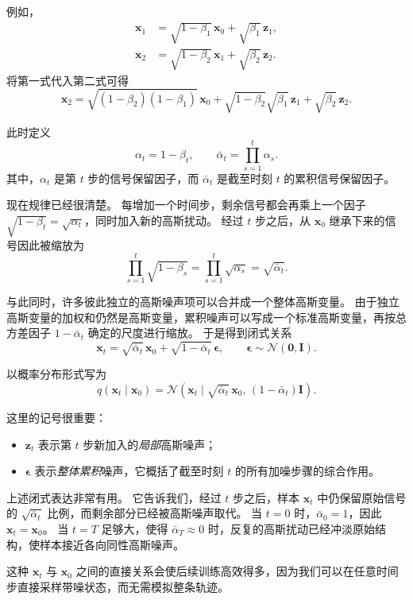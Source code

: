 例如，
\[
\begin{aligned}
\mathbf{x}_1
&=
\sqrt{1-\beta_1}\,\mathbf{x}_0
+
\sqrt{\beta_1}\,\mathbf{z}_1,\\[4pt]
\mathbf{x}_2
&=
\sqrt{1-\beta_2}\,\mathbf{x}_1
+
\sqrt{\beta_2}\,\mathbf{z}_2.
\end{aligned}
\]
将第一式代入第二式可得
\[
\mathbf{x}_2
=
\sqrt{(1-\beta_2)(1-\beta_1)}\,\mathbf{x}_0
+
\sqrt{1-\beta_2}\sqrt{\beta_1}\,\mathbf{z}_1
+
\sqrt{\beta_2}\,\mathbf{z}_2.
\]

此时定义
\[
\alpha_t = 1-\beta_t,
\qquad
\bar{\alpha}_t = \prod_{s=1}^{t}\alpha_s.
\]
其中，$\alpha_t$ 是第 $t$ 步的信号保留因子，而 $\bar{\alpha}_t$ 是截至时刻 $t$ 的累积信号保留因子。

现在规律已经很清楚。
每增加一个时间步，剩余信号都会再乘上一个因子
$\sqrt{1-\beta_t}=\sqrt{\alpha_t}$，同时加入新的高斯扰动。
经过 $t$ 步之后，从 $\mathbf{x}_0$ 继承下来的信号因此被缩放为
\[
\prod_{s=1}^{t}\sqrt{1-\beta_s}
=
\prod_{s=1}^{t}\sqrt{\alpha_s}
=
\sqrt{\bar{\alpha}_t}.
\]

与此同时，许多彼此独立的高斯噪声项可以合并成一个整体高斯变量。
由于独立高斯变量的加权和仍然是高斯变量，累积噪声可以写成一个标准高斯变量，再按总方差因子 $1-\bar{\alpha}_t$ 确定的尺度进行缩放。
于是得到闭式关系
\[
\mathbf{x}_t
=
\sqrt{\bar{\alpha}_t}\,\mathbf{x}_0
+
\sqrt{1-\bar{\alpha}_t}\,\boldsymbol{\epsilon},
\qquad
\boldsymbol{\epsilon}\sim\mathcal{N}(\mathbf{0},\mathbf{I}).
\]

以概率分布形式写为
\[
q(\mathbf{x}_t\mid \mathbf{x}_0)
=
\mathcal{N}\!\left(
\mathbf{x}_t \mid
\sqrt{\bar{\alpha}_t}\,\mathbf{x}_0,\,
(1-\bar{\alpha}_t)\mathbf{I}
\right).
\]

这里的记号很重要：
\begin{itemize}
    \item $\mathbf{z}_t$ 表示第 $t$ 步新加入的\emph{局部}高斯噪声；
    \item $\boldsymbol{\epsilon}$ 表示\emph{整体累积}噪声，它概括了截至时刻 $t$ 的所有加噪步骤的综合作用。
\end{itemize}

上述闭式表达非常有用。
它告诉我们，经过 $t$ 步之后，样本 $\mathbf{x}_t$ 中仍保留原始信号的
$\sqrt{\bar{\alpha}_t}$ 比例，而剩余部分已经被高斯噪声取代。
当 $t=0$ 时，$\bar{\alpha}_0=1$，因此 $\mathbf{x}_t=\mathbf{x}_0$。
当 $t=T$ 足够大，使得 $\bar{\alpha}_T\approx 0$ 时，反复的高斯扰动已经冲淡原始结构，使样本接近各向同性高斯噪声。

这种 $\mathbf{x}_t$ 与 $\mathbf{x}_0$ 之间的直接关系会使后续训练高效得多，因为我们可以在任意时间步直接采样带噪状态，而无需模拟整条轨迹。

